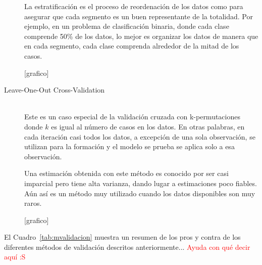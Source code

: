 \begin{description}
      La estratificación es el proceso de reordenación de los datos como para asegurar que cada segmento es un buen representante de la totalidad. Por ejemplo, en un problema de clasificación binaria, donde cada clase comprende 50\% de los datos, lo mejor es organizar los datos de manera que en cada segmento, cada clase comprenda alrededor de la mitad de los casos.
      
      [grafico]
      
      \item[Leave-One-Out Cross-Validation] \hfill \\
     Este es un caso especial de la validación cruzada con k-permutaciones donde $k$ es igual al número de casos en los datos. En otras palabras, en cada iteración casi todos los datos, a excepción de una sola observación, se utilizan para la formación y el modelo se prueba se aplica solo a esa observación. 
     
     Una estimación obtenida con este método es conocido por ser casi imparcial pero tiene alta varianza, dando lugar a estimaciones poco fiables. Aún así es un método muy utilizado cuando los datos disponibles son muy raros.
     
      [grafico]
    \end{description}

El Cuadro~\ref{tab:mvalidacion} muestra un resumen de los pros y contra de los diferentes métodos de validación descritos anteriormente... \textcolor{red}{Ayuda con qué decir aquí :S}

